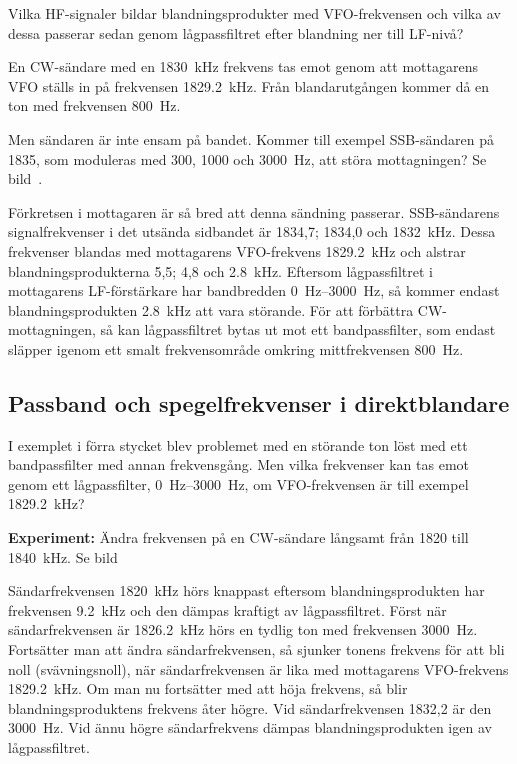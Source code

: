 Vilka HF-signaler bildar blandningsprodukter med VFO-frekvensen och
vilka av dessa passerar sedan genom lågpassfiltret efter blandning ner
till LF-nivå?

\begin{exempelbox}
En CW-sändare med en \qty{1830}{\kilo\hertz} frekvens tas emot genom att
mottagarens VFO ställs in på frekvensen \qty{1829,2}{\kilo\hertz}.
Från blandarutgången kommer då en ton med frekvensen \qty{800}{\hertz}.

Men sändaren är inte ensam på bandet.
Kommer till exempel SSB-sändaren på 1835, som moduleras med 300, 1000 och
\qty{3000}{\hertz}, att störa mottagningen?
Se bild~.

Förkretsen i mottagaren är så bred att denna sändning passerar.
SSB-sändarens signalfrekvenser i det utsända sidbandet är 1834,7; 1834,0 och
\qty{1832}{\kilo\hertz}.
Dessa frekvenser blandas med mottagarens VFO-frekvens \qty{1829,2}{\kilo\hertz}
och alstrar blandningsprodukterna 5,5; 4,8 och \qty{2,8}{\kilo\hertz}.
Eftersom lågpassfiltret i mottagarens LF-förstärkare har bandbredden
\SIrange{0}{3000}{\hertz}, så kommer endast blandningsprodukten
\qty{2,8}{\kilo\hertz} att vara störande.
För att förbättra CW-mottagningen, så kan lågpassfiltret bytas ut mot ett
bandpassfilter, som endast släpper igenom ett smalt frekvensområde omkring
mittfrekvensen \qty{800}{\hertz}.
\end{exempelbox}

\subsection{Passband och spegelfrekvenser i direktblandare}
\label{passband_spegelfrekvens}

I exemplet i förra stycket blev problemet med en störande ton löst med
ett bandpassfilter med annan frekvensgång.
Men vilka frekvenser kan tas emot genom ett lågpassfilter,
\SIrange{0}{3000}{\hertz}, om VFO-frekvensen är till exempel
\qty{1829,2}{\kilo\hertz}?

\textbf{Experiment:}
Ändra frekvensen på en CW-sändare långsamt från 1820 till
\qty{1840}{\kilo\hertz}.
Se bild~

Sändarfrekvensen \qty{1820}{\kilo\hertz} hörs knappast eftersom
blandningsprodukten har frekvensen \qty{9,2}{\kilo\hertz} och den dämpas
kraftigt av lågpassfiltret.
Först när sändarfrekvensen är \qty{1826,2}{\kilo\hertz} hörs en tydlig ton med
frekvensen \qty{3000}{\hertz}.
Fortsätter man att ändra sändarfrekvensen, så sjunker tonens frekvens för att
bli noll (svävningsnoll), när sändarfrekvensen är lika med mottagarens
VFO-frekvens \qty{1829,2}{\kilo\hertz}.
Om man nu fortsätter med att höja frekvens, så blir blandningsproduktens
frekvens åter högre.
Vid sändarfrekvensen 1832,2 är den \qty{3000}{\hertz}.
Vid ännu högre sändarfrekvens dämpas blandningsprodukten igen av lågpassfiltret.

